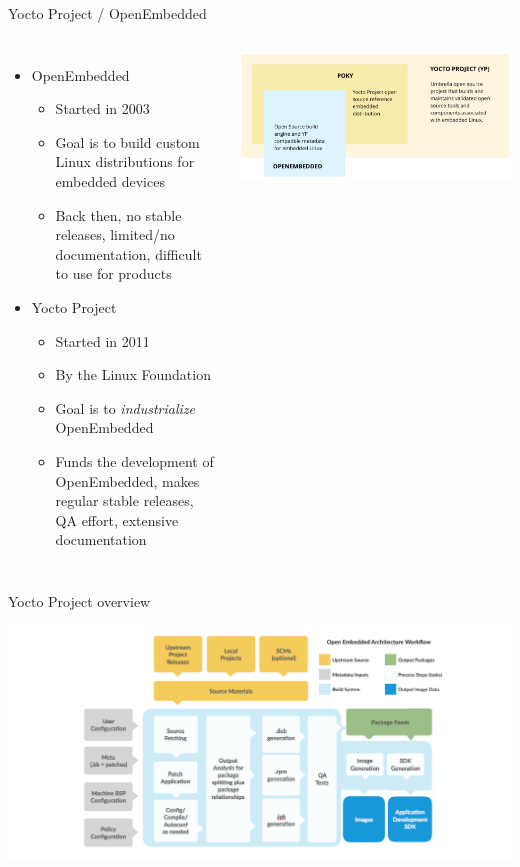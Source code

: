\begin{frame}{Yocto Project / OpenEmbedded}
  \begin{columns}
  \begin{itemize}
  \item OpenEmbedded
    \begin{itemize}
    \item Started in 2003
    \item Goal is to build custom Linux distributions for embedded
      devices
    \item Back then, no stable releases, limited/no documentation,
      difficult to use for products
    \end{itemize}
  \item Yocto Project
    \begin{itemize}
    \item Started in 2011
    \item By the Linux Foundation
    \item Goal is to {\em industrialize} OpenEmbedded
    \item Funds the development of OpenEmbedded, makes regular stable
      releases, QA effort, extensive documentation
    \end{itemize}
  \end{itemize}
  \includegraphics[width=\textwidth]{slides/sysdev-build-systems/yp-diagram-overview.png}
\end{columns}
\end{frame}

\begin{frame}{Yocto Project overview}
  \begin{center}
    \includegraphics[width=\textwidth]{slides/sysdev-build-systems/yp-how-it-works-new-diagram.png}
  \end{center}
\end{frame}


